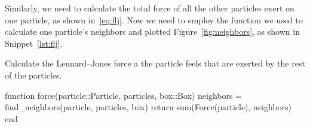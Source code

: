 Similarly, we need to calculate the total force of all the other particles
exert on one particle, as shown in~\eqref{eq:flj}. Now we need to employ the
 function we used to calculate one particle's neighbors and plotted
Figure~\ref{fig:neighbors}, as shown in Snippet~\ref{lst:flj}.
%
\begin{algorithm}
    \caption{Calculate the Lennard--Jones force a the particle feels that are exerted by
        the rest of the particles.}
    \label{lst:flj}
    \begin{juliacode}
        function force(particle::Particle, particles, box::Box)
            neighbors = find_neighbors(particle, particles, box)
            return sum(Force(particle), neighbors)
        end
    \end{juliacode}
\end{algorithm}
